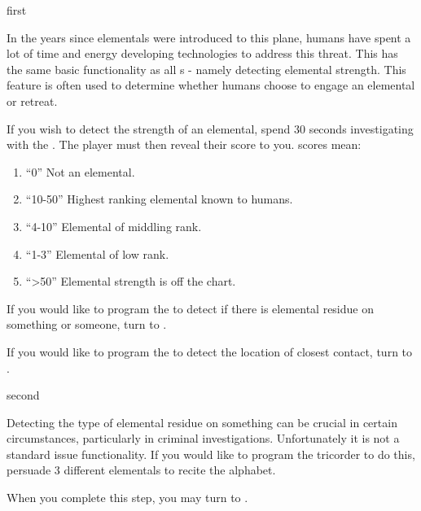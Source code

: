 \documentclass[notebook]{elementals}
\begin{document}

\startnotebook{\nTricorder{}}

\begin{page}{first}

In the years since elementals were introduced to this plane, humans have spent a lot of time and energy developing technologies to address this threat. This \iTricorder{} has the same basic functionality as all \iTricorder{}s - namely detecting elemental strength. This feature is often used to determine whether humans choose to engage an elemental or retreat.

If you wish to detect the strength of an elemental, spend 30 seconds investigating with the \iTricorder{}. The player must then reveal their \beta score to you. \beta scores mean:
\begin{enumerate}
  \item ``0'' Not an elemental.
  \item ``10-50'' Highest ranking elemental known to humans.
  \item ``4-10'' Elemental of middling rank.
  \item ``1-3'' Elemental of low rank.
  \item ``>50'' Elemental strength is off the chart.

\end{enumerate}

If you would like to program the \iTricorder{} to detect if there is elemental residue on something or someone, turn to .

If you would like to program the \iTricorder{} to detect the location of closest contact, turn to .

\end{page}

\begin{page}{second}

Detecting the type of elemental residue on something can be crucial in certain circumstances, particularly in criminal investigations. Unfortunately it is not a standard issue functionality. If you would like to program the tricorder to do this, persuade 3 different elementals to recite the alphabet.

When you complete this step, you may turn to .

\end{page}
\end{document}
